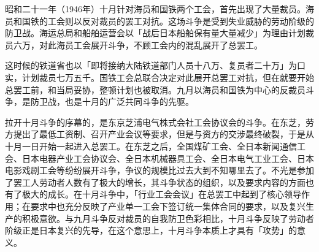 \documentclass[a4paper,12pt]{article}
\begin{document}
昭和二十一年（1946年）十月针对海员和国铁两个工会，首先出现了大量裁员。海员和国铁的工会则以反对裁员的罢工对抗。这场斗争是受到失业威胁的劳动阶级的防卫战。海运总局和船舶运营会以「战后日本船舶保有量大量减少」为理由计划裁员六万，对此海员工会展开斗争，不顾工会内的混乱展开了总罢工。

这时候的铁道省也以「即将接纳大陆铁道部门人员十八万、复员者二十万」为口实，计划裁员七万五千。国铁工会总联合决定对此展开总罢工对抗，但在就要开始总罢工前，和当局妥协，整顿计划也被取消。九月以海员和国铁为中心的反裁员斗争，是防卫战，也是十月的广泛共同斗争的先驱。

拉开十月斗争的序幕的，是东京芝浦电气株式会社工会协议会的斗争。在东芝，劳方提出了最低工资制、召开产业会议等要求，但是与资方的交涉最终破裂，于是从十月一日开始一起进入总罢工。在东芝之后，全国煤矿工会、全日本新闻通信工会、日本电器产业工会协议会、全日本机械器具工会、全日本电气工业工会、日本电影戏剧工会等纷纷展开斗争，争议的规模比过去大到不知哪里去了。不光是参加了罢工人劳动者人数有了极大的增长，其斗争状态的组织，以及要求内容的方面也有了极大的成长。在十月斗争中，「行业工会会议」在总罢工中起到了核心领导作用；在要求中也充分反映了产业单一工会下签订统一集体合同的要求，以及复兴生产的积极意欲。与九月斗争反对裁员的自我防卫色彩相比，十月斗争反映了劳动者阶级正是日本复兴的先导，在这个意思上，十月斗争本质上才具有「攻势」的意义。
\end{document}

